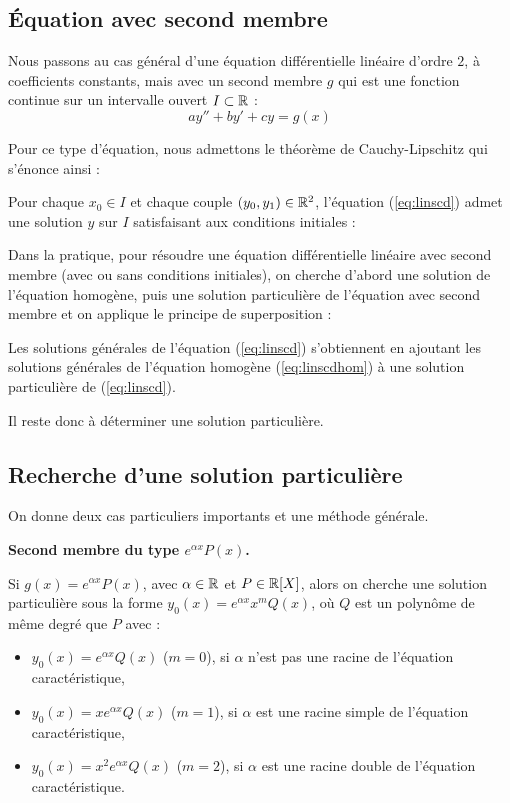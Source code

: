 \documentclass[class=report,crop=false]{standalone}
\begin{document}
\subsection{Équation avec second membre}

Nous passons au cas général d'une équation différentielle linéaire d'ordre $2$, à coefficients constants,
mais avec un second membre $g$ qui est une fonction continue sur
un intervalle ouvert $I \subset \mathbb{R}$ :
\begin{equation}
ay''+by'+cy=g(x)
\tag{$E$}
\end{equation}

Pour ce type d'équation, nous admettons le théorème de Cauchy-Lipschitz qui s'énonce ainsi :
\begin{theoreme}
Pour chaque $x_0\in I$ et chaque couple $(y_0,y_1) \in \mathbb{R}^2$,
l'équation (\ref{eq:linscd}) admet une 
solution $y$ sur $I$ satisfaisant aux conditions initiales :
\end{theoreme}


Dans la pratique, pour résoudre une équation différentielle linéaire avec second membre
(avec ou sans conditions initiales), on cherche d'abord une solution de l'équation homogène,
puis une solution particulière de l'équation avec second membre et on applique
le principe de superposition :
\begin{proposition}
Les solutions générales de l'équation (\ref{eq:linscd}) s'obtiennent en
ajoutant les solutions générales de l'équation homogène (\ref{eq:linscdhom})
à une solution particulière de (\ref{eq:linscd}).
\end{proposition}

Il reste donc à déterminer une solution particulière.

\subsection{Recherche d'une solution particulière}

On donne deux cas particuliers importants et une méthode générale.


\bigskip

\textbf{Second membre du type $e^{\alpha x}P(x)$.}

Si $g(x)=e^{\alpha x}P(x)$, avec $\alpha \in \mathbb{R}$ et $P\in \mathbb{R}[X]$,
alors on cherche une solution particulière sous la forme
$y_0(x)=e^{\alpha x}x^{m}Q(x)$, où $Q$ est un polynôme de
même degré que $P$ avec :
\begin{itemize}
\item $y_0(x)=e^{\alpha x}Q(x)$ ($m=0$), si $\alpha$ n'est pas une racine de l'équation caractéristique,
\item $y_0(x)=xe^{\alpha x}Q(x)$ ($m=1$), si $\alpha$ est une racine simple de l'équation caractéristique,
\item $y_0(x)=x^2e^{\alpha x}Q(x)$ ($m=2$), si $\alpha$ est une racine double de l'équation caractéristique.
\end{itemize}
\end{document}
